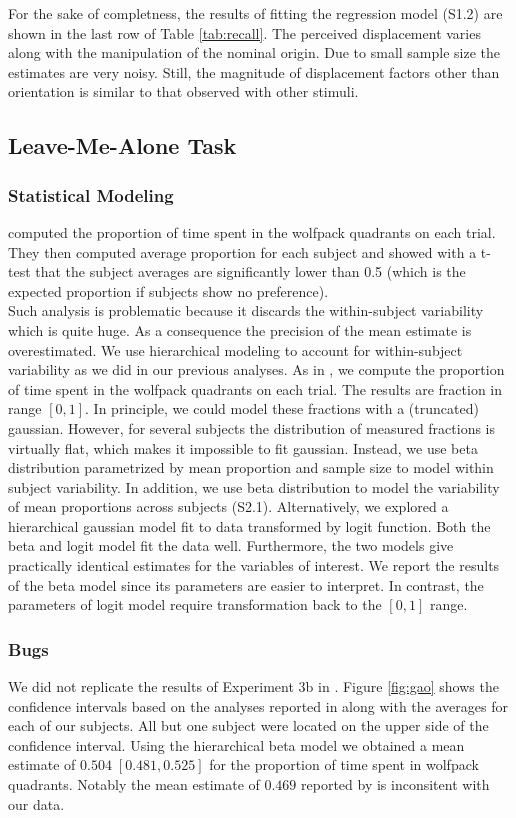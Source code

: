 \documentclass[10pt]{article}
\begin{document}
For the sake of completness, the results of fitting the regression model (S1.2) are shown in the last row of Table \ref{tab:recall}. 
The perceived displacement varies along with the manipulation of the nominal origin.
Due to small sample size the estimates are very noisy. 
Still, the magnitude of displacement factors other than orientation is similar to that observed with other stimuli.

\subsection*{Leave-Me-Alone Task}
\subsubsection*{Statistical Modeling}
\cite{gao10} computed the proportion of time spent in the wolfpack quadrants on each trial. 
They then computed average proportion for each subject and showed with a t-test that the subject averages are significantly lower than 0.5 (which is the expected proportion if subjects show no preference).\\
Such analysis is problematic because it discards the within-subject variability which is quite huge. 
As a consequence the precision of the mean estimate is overestimated. We use hierarchical modeling to account for within-subject variability as we did in our previous analyses.
As in \cite{gao10}, we compute the proportion of time spent in the wolfpack quadrants on each trial.
The results are fraction in range $[0,1]$.
In principle, we could model these fractions with a (truncated) gaussian. 
However, for several subjects the distribution of measured fractions is virtually flat, which makes it impossible to fit gaussian. 
Instead, we use beta distribution parametrized by mean proportion and sample size to model within subject variability. 
In addition, we use beta distribution to model the variability of mean proportions across subjects (S2.1). 
Alternatively, we explored a hierarchical gaussian model fit to data transformed by logit function. 
Both the beta and logit model fit the data well. 
Furthermore, the two models give practically identical estimates for the variables of interest. 
We report the results of the beta model since its parameters are easier to interpret. 
In contrast, the parameters of logit model require transformation back to the $[0,1]$ range.\\

\subsubsection*{Bugs}
We did not replicate the results of Experiment 3b in \cite{gao10}. 
Figure \ref{fig:gao} shows the confidence intervals based on the analyses reported in \cite{gao10} along with the averages for each of our subjects. %
All but one subject were located on the upper side of the confidence interval. 
Using the hierarchical beta model we obtained a mean estimate of $0.504 \; [0.481,0.525] $ for the proportion of time spent in wolfpack quadrants. 
Notably the mean estimate of $0.469$ reported by \cite{gao10} is inconsitent with our data.\\
\end{document}
